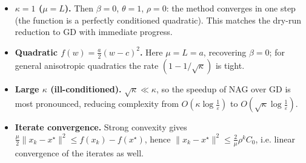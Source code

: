 \documentclass[11pt]{article}
\begin{document}
\begin{itemize}
\item \textbf{$\kappa=1$ ($\mu=L$).} Then $\beta=0$, $\theta=1$, $\rho=0$: the method converges in one step (the function is a perfectly conditioned quadratic). This matches the dry-run reduction to GD with immediate progress.

\item \textbf{Quadratic $f(w)=\tfrac{a}{2}(w-c)^2$.} Here $\mu=L=a$, recovering $\beta=0$; for general anisotropic quadratics the rate $(1-1/\sqrt\kappa)$ is tight.

\item \textbf{Large $\kappa$ (ill-conditioned).} $\sqrt{\kappa}\ll\kappa$, so the speedup of NAG over GD is most pronounced, reducing complexity from $O(\kappa\log\frac1\varepsilon)$ to $O(\sqrt\kappa\log\frac1\varepsilon)$.

\item \textbf{Iterate convergence.} Strong convexity gives $\frac{\mu}{2}\|x_k-x^\star\|^2\le f(x_k)-f(x^\star)$, hence
$\|x_k-x^\star\|^2 \le \frac{2}{\mu}\rho^k C_0$, i.e. linear convergence of the iterates as well.
\end{itemize}
\end{document}
